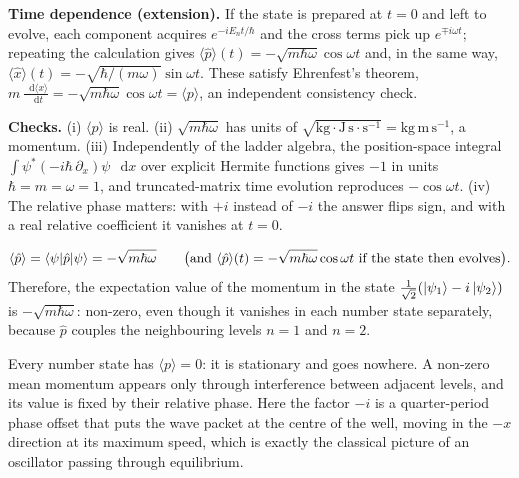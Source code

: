 \documentclass[12pt]{article}
\renewcommand{\d}{\mathop{}\!\mathrm{d}}
\begin{document}
\begin{solutionbox}
\textbf{Time dependence (extension).} If the state is prepared at $t=0$ and left to evolve, each component acquires $e^{-iE_nt/\hbar}$ and the cross terms pick up $e^{\mp i\omega t}$; repeating the calculation gives $\langle\hat p\rangle(t)=-\sqrt{m\hbar\omega}\cos\omega t$ and, in the same way, $\langle\hat x\rangle(t)=-\sqrt{\hbar/(m\omega)}\sin\omega t$. These satisfy Ehrenfest's theorem, $m\,\frac{\d\langle x\rangle}{\d t}=-\sqrt{m\hbar\omega}\cos\omega t=\langle p\rangle$, an independent consistency check.

\textbf{Checks.} (i) $\langle p\rangle$ is real. (ii) $\sqrt{m\hbar\omega}$ has units of $\sqrt{\mathrm{kg\cdot J\,s\cdot s^{-1}}}=\mathrm{kg\,m\,s^{-1}}$, a momentum. (iii) Independently of the ladder algebra, the position-space integral $\int\psi^*(-i\hbar\,\partial_x)\psi\,\d x$ over explicit Hermite functions gives $-1$ in units $\hbar=m=\omega=1$, and truncated-matrix time evolution reproduces $-\cos\omega t$. (iv) The relative phase matters: with $+i$ instead of $-i$ the answer flips sign, and with a real relative coefficient it vanishes at $t=0$.
\end{solutionbox}

\begin{answerbox}
\[
\langle\hat p\rangle=\braket{\psi|\hat p|\psi}=-\sqrt{m\hbar\omega}\qquad\big(\text{and }\langle\hat p\rangle(t)=-\sqrt{m\hbar\omega}\cos\omega t\text{ if the state then evolves}\big).
\]
Therefore, the expectation value of the momentum in the state $\frac{1}{\sqrt2}(\ket{\psi_1}-i\ket{\psi_2})$ is $-\sqrt{m\hbar\omega}$: non-zero, even though it vanishes in each number state separately, because $\hat p$ couples the neighbouring levels $n=1$ and $n=2$.
\end{answerbox}

\begin{insightbox}
Every number state has $\langle p\rangle=0$: it is stationary and goes nowhere. A non-zero mean momentum appears only through interference between adjacent levels, and its value is fixed by their relative phase. Here the factor $-i$ is a quarter-period phase offset that puts the wave packet at the centre of the well, moving in the $-x$ direction at its maximum speed, which is exactly the classical picture of an oscillator passing through equilibrium.
\end{insightbox}
\fi


\newpage
\end{document}

